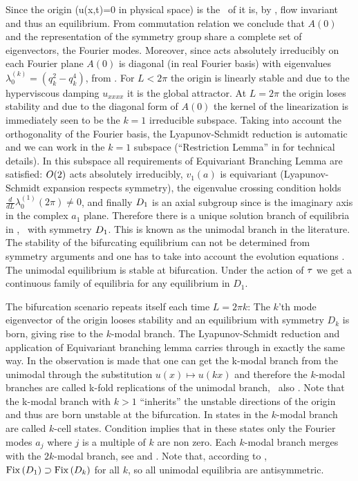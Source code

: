  Since the origin (u(x,t)=0 in physical space) is the \fixedsp\ of  it is, 
by , flow invariant and thus
an equilibrium. From commutation relation  we conclude that $A(0)$
and the representation of the symmetry group  share a complete
set of eigenvectors, the Fourier modes. Moreover, since  acts absolutely irreducibly
on each Fourier plane $A(0)$ is diagonal (in real Fourier basis)
with eigenvalues $\lambda_0^{(k)}=( q_k^2 - q_k^4 )$, from .
For $L<2\pi$
the origin is linearly stable and due to the hyperviscous damping $u_{xxxx}$ it is the global
attractor. At $L=2\pi$ the origin loses stability and due
to the diagonal form of $A(0)$ the kernel of the linearization is immediately seen to be the
$k=1$ irreducible subspace. Taking into account the orthogonality of the Fourier basis, the Lyapunov-Schmidt reduction is automatic and we can work in the $k=1$ subspace (\cf ``Restriction Lemma'' in 
for technical details). In this subspace all requirements
of Equivariant Branching Lemma are satisfied: $O(2)$ acts
absolutely irreducibly, $v_1(a)$ is equivariant (Lyapunov-Schmidt expansion respects symmetry),
the eigenvalue crossing condition holds $\frac{d}{d L}\lambda_0^{(1)}(2\pi)\neq 0$, and
finally $D_{1}$ is an axial subgroup since  is the imaginary axis in the complex $a_1$ plane.
Therefore there is a unique solution branch of equilibria in , \ie\ with symmetry $D_{1}$.
This is known as the unimodal branch in the literature. The stability of the bifurcating equilibrium
can not be determined from symmetry arguments and one has to take into account the evolution equations
. The unimodal equilibrium is stable at bifurcation. Under the action of $\tau$ we
get a continuous family of equilibria for any equilibrium in $D_1$.

The bifurcation scenario repeats itself each time $L=2\pi k$: The $k$'th mode eigenvector of
the origin looses stability and an equilibrium with symmetry $D_k$ is born, giving rise to
the $k$-modal branch. The Lyapunov-Schmidt reduction and application of Equivariant branching lemma
carries through in exactly the same way. In  the observation is made that one
can get the k-modal branch from the unimodal through the substitution $u(x)\mapsto u(kx)$
and therefore the $k$-modal branches are called k-fold replications
of the unimodal branch, \cf\ also . Note that the k-modal branch
with $k>1$ ``inherits'' the unstable directions of the origin and thus are born unstable at the
bifurcation. In  states in the $k$-modal branch are called $k$-cell states.
Condition  implies that in these states only the Fourier modes $a_j$ where $j$
is a multiple of $k$ are non zero. Each $k$-modal branch merges with the $2k$-modal branch, see 
and . Note that, according to , $\mathrm{Fix}\left(D_{1}\right)\supset\mathrm{Fix}\left(D_{k}\right)$
for all $k$, so all unimodal equilibria are antisymmetric.


